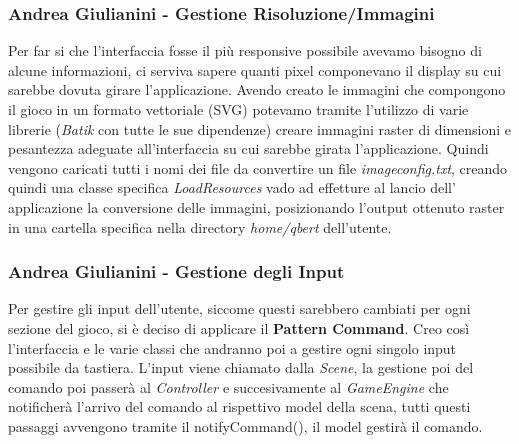 \documentclass[a4paper,12pt, hidelinks]{report}
\begin{document}
\begin{flushright}
\item\subsubsection{Andrea Giulianini - Gestione Risoluzione/Immagini}
\end{flushright}

Per far si che l'interfaccia fosse il più responsive possibile avevamo bisogno di alcune informazioni, ci serviva sapere quanti pixel componevano il display su cui sarebbe dovuta girare l'applicazione.
Avendo creato le immagini che compongono il gioco in un formato vettoriale (SVG) potevamo tramite l'utilizzo di varie librerie (\emph{Batik} con tutte le sue dipendenze) creare immagini raster di dimensioni e pesantezza adeguate all'interfaccia su cui sarebbe girata l'applicazione. Quindi vengono caricati tutti i nomi dei file da convertire un file \emph{imageconfig.txt}, creando quindi una classe specifica \emph{LoadResources} vado ad effetture al lancio dell' applicazione la conversione delle immagini, posizionando l'output ottenuto raster in una cartella specifica nella directory \emph{home/qbert} dell'utente.

\begin{flushright}
\item\subsubsection{Andrea Giulianini - Gestione degli Input}
\end{flushright}

Per gestire gli input dell'utente, siccome questi sarebbero cambiati per ogni sezione del gioco, si è deciso di applicare il \textbf{Pattern Command}. Creo così l'interfaccia e le varie classi che andranno poi a gestire ogni singolo input possibile da tastiera. L'input viene chiamato dalla \emph{Scene}, la gestione poi del comando poi passerà al \emph{Controller} e succesivamente al \emph{GameEngine} che notificherà l'arrivo del comando al rispettivo model della scena, tutti questi passaggi avvengono tramite il notifyCommand(), il model gestirà il comando.
\end{document}
